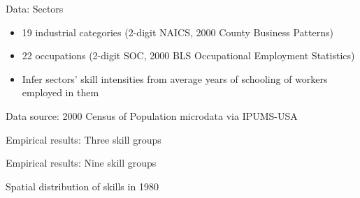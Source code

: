 \documentclass[10pt,notes=hide]{beamer}
\begin{document}
\begin{frame}{Data: Sectors}
\begin{itemize}
\item 19 industrial categories {\scriptsize{} (2-digit NAICS, 2000 County
Business Patterns) }{\scriptsize \par}
\item 22 occupations{\scriptsize{} (2-digit SOC, 2000 BLS Occupational Employment
Statistics)}{\scriptsize \par}
\item Infer sectors' skill intensities from average years of schooling of
workers employed in them
\end{itemize}
\resizebox{\textwidth}{!}{}
\begin{minipage}{.9\textwidth}\begin{center}
\scriptsize{Data source: 2000 Census of Population microdata via IPUMS-USA\par}
\end{center}\end{minipage}
\end{frame}
\begin{frame}{Empirical results: Three skill groups}
\begin{table}
\begin{centering}
\resizebox{\textwidth}{!}{}
\par\end{centering}
\end{table}
\end{frame}
\begin{frame}{Empirical results: Nine skill groups}
\begin{table}
\begin{centering}
\resizebox{.9\textwidth}{!}{}
\par\end{centering}
\end{table}
\end{frame}
\begin{frame}{Spatial distribution of skills in 1980}
\begin{table}
\begin{centering}
\resizebox{\textwidth}{!}{}
\par\end{centering}
\end{table}
\end{frame}
\end{document}
